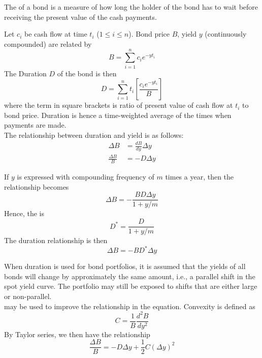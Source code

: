 \begin{definition}
The  of a bond is a measure of how long the holder of the bond has to wait before receiving the present value of the cash payments.
\end{definition}

Let $c_i$ be cash flow at time $t_i$ ($1 \leq i \leq n$). Bond price $B$, yield $y$ (continuously compounded) are related by
\begin{equation}
B = \sum\limits_{i=1}^n c_i e^{-y t_i} \nonumber
\end{equation}
The Duration $D$ of the bond is then
\begin{equation}
D = \sum\limits_{i=1}^n t_i \left[ \frac{c_i e^{-y t_i}}{B} \right] \nonumber
\end{equation}
where the term in square brackets is ratio of present value of cash flow at $t_i$ to bond price. Duration is hence a time-weighted average of the times when payments are made.\\
The relationship between duration and yield is as follows:
\begin{align}
\Delta B &= \frac{dB}{dy} \Delta y \nonumber \\
\frac{\Delta B}{B} &= - D \Delta y \nonumber
\end{align}

If $y$ is expressed with compounding frequency of $m$ times a year, then the relationship becomes
\begin{equation}
\Delta B = - \frac{BD \Delta y}{1 + y/m} \nonumber
\end{equation}
Hence, the  is 
\begin{equation}
D^* = \frac{D}{1 + y/m} \nonumber
\end{equation}
The duration relationship is then
\begin{equation}
\Delta B = - B D^* \Delta y \nonumber
\end{equation}

When duration is used for bond portfolios, it is assumed that the yields of all bonds will change by approximately the same amount, i.e., a parallel shift in the spot yield curve. The portfolio may still be exposed to shifts that are either large or non-parallel.\\
 may be used to improve the relationship in the equation. Convexity is defined as
\begin{equation}
C = \frac{1}{B} \frac{d^2 B}{dy^2} \nonumber
\end{equation}
By Taylor series, we then have the relationship
\begin{equation}
\frac{\Delta B}{B} = -D \Delta y + \frac{1}{2}C(\Delta y)^2 \nonumber
\end{equation}






